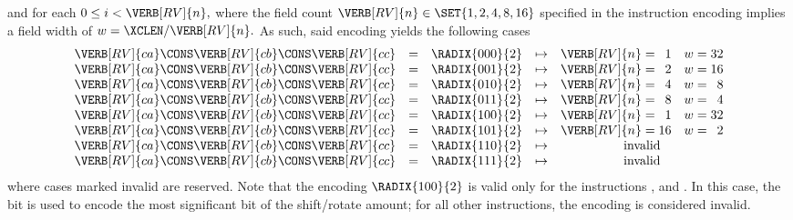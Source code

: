\noindent
and for each 
$
0 \leq i < \VERB[RV]{n} ,
$ 
where the field count
$
\VERB[RV]{n} \in \SET{ 1, 2, 4, 8, 16 }
$ 
specified in the instruction encoding implies a field width of 
$
w = \XCLEN / \VERB[RV]{n} .
$
As such, said encoding yields the following cases
\[
\begin{array}{ccrcc@{\;}c@{\;}rc@{\;}c@{\;}r}
\VERB[RV]{ca} \CONS \VERB[RV]{cb} \CONS \VERB[RV]{cc} &=& \RADIX{000}{2} &\mapsto& \VERB[RV]{n} &=&  1 & w &=& 32     \\
\VERB[RV]{ca} \CONS \VERB[RV]{cb} \CONS \VERB[RV]{cc} &=& \RADIX{001}{2} &\mapsto& \VERB[RV]{n} &=&  2 & w &=& 16     \\
\VERB[RV]{ca} \CONS \VERB[RV]{cb} \CONS \VERB[RV]{cc} &=& \RADIX{010}{2} &\mapsto& \VERB[RV]{n} &=&  4 & w &=&  8     \\
\VERB[RV]{ca} \CONS \VERB[RV]{cb} \CONS \VERB[RV]{cc} &=& \RADIX{011}{2} &\mapsto& \VERB[RV]{n} &=&  8 & w &=&  4     \\
\VERB[RV]{ca} \CONS \VERB[RV]{cb} \CONS \VERB[RV]{cc} &=& \RADIX{100}{2} &\mapsto& \VERB[RV]{n} &=&  1 & w &=& 32     \\
\VERB[RV]{ca} \CONS \VERB[RV]{cb} \CONS \VERB[RV]{cc} &=& \RADIX{101}{2} &\mapsto& \VERB[RV]{n} &=& 16 & w &=&  2     \\
\VERB[RV]{ca} \CONS \VERB[RV]{cb} \CONS \VERB[RV]{cc} &=& \RADIX{110}{2} &\mapsto& \multicolumn{6}{c}{\mbox{invalid}} \\
\VERB[RV]{ca} \CONS \VERB[RV]{cb} \CONS \VERB[RV]{cc} &=& \RADIX{111}{2} &\mapsto& \multicolumn{6}{c}{\mbox{invalid}} \\
\end{array}
\]
where cases marked invalid are reserved.  Note that the encoding 
$
\RADIX{100}{2}
$
is valid only for the instructions
,
 and
.
In this case, the  bit is used to encode the most significant
bit of the shift/rotate amount; for all other instructions, the encoding
is considered invalid.



